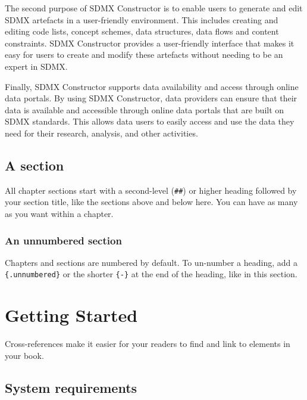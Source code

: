 \documentclass[
]{book}
\theoremstyle{definition}
\theoremstyle{definition}
\theoremstyle{definition}
\theoremstyle{definition}
\theoremstyle{remark}
\begin{document}
The second purpose of SDMX Constructor is to enable users to generate and edit SDMX artefacts in a user-friendly environment. This includes creating and editing code lists, concept schemes, data structures, data flows and content constraints. SDMX Constructor provides a user-friendly interface that makes it easy for users to create and modify these artefacts without needing to be an expert in SDMX.

Finally, SDMX Constructor supports data availability and access through online data portals. By using SDMX Constructor, data providers can ensure that their data is available and accessible through online data portals that are built on SDMX standards. This allows data users to easily access and use the data they need for their research, analysis, and other activities.

\hypertarget{a-section}{%
\section{A section}\label{a-section}}

All chapter sections start with a second-level (\texttt{\#\#}) or higher heading followed by your section title, like the sections above and below here. You can have as many as you want within a chapter.

\hypertarget{an-unnumbered-section}{%
\subsection*{An unnumbered section}\label{an-unnumbered-section}}

Chapters and sections are numbered by default. To un-number a heading, add a \texttt{\{.unnumbered\}} or the shorter \texttt{\{-\}} at the end of the heading, like in this section.

\hypertarget{getting-started}{%
\chapter{Getting Started}\label{getting-started}}

Cross-references make it easier for your readers to find and link to elements in your book.

\hypertarget{system-requirements}{%
\section{System requirements}\label{system-requirements}}
\end{document}
